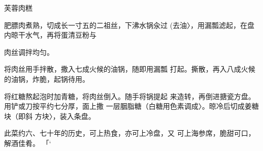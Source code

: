 \begin{recipe}{芙蓉肉糕}

\ingredients


\cooking

\step 	肥膘肉煮熟，切成长一寸五的二祖丝，下沸水锅汆过 (去油〉，用漏瓢滤起，在盘内晾干水气，再将蛋清豆粉与

肉丝调拌均匀。

\step 	将肉丝用手拌散，撒入七成火候的油锅，随即用漏瓢 打起。撕散，再入八成火候的油锅，炸脆，起锅待用。

\step 	将红糖熬起泡时加青糖，将肉丝倒入。随手将锅提起 来造转，再倒进搪瓷方盘。用铲或刀按平约七分厚，面上撒 一层胭脂糖（白糖用色素调成〉。晾冷后切成姜糖块（即斜 方块〉，装入条盘。

\notes

此菜约六、七十年的历史，可上热食，亦可上冷盘，又 可上海参席，脆甜可口，解酒佳肴。	「‘

\end{recipe}


